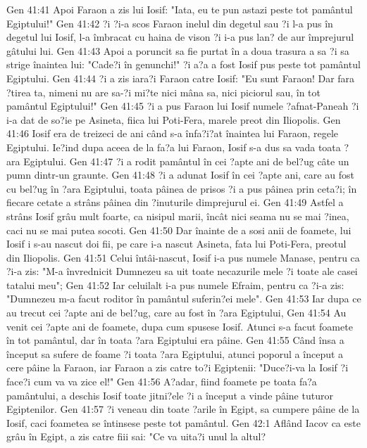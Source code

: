 Gen 41:41  Apoi Faraon a zis lui Iosif: "Iata, eu te pun astazi peste tot pamântul Egiptului!"
Gen 41:42  ?i ?i-a scos Faraon inelul din degetul sau ?i l-a pus în degetul lui Iosif, l-a îmbracat cu haina de vison ?i i-a pus lan? de aur împrejurul gâtului lui.
Gen 41:43  Apoi a poruncit sa fie purtat în a doua trasura a sa ?i sa strige înaintea lui: "Cade?i în genunchi!" ?i a?a a fost Iosif pus peste tot pamântul Egiptului.
Gen 41:44  ?i a zis iara?i Faraon catre Iosif: "Eu sunt Faraon! Dar fara ?tirea ta, nimeni nu are sa-?i mi?te nici mâna sa, nici piciorul sau, în tot pamântul Egiptului!"
Gen 41:45  ?i a pus Faraon lui Iosif numele ?afnat-Paneah ?i i-a dat de so?ie pe Asineta, fiica lui Poti-Fera, marele preot din Iliopolis.
Gen 41:46  Iosif era de treizeci de ani când s-a înfa?i?at înaintea lui Faraon, regele Egiptului. Ie?ind dupa aceea de la fa?a lui Faraon, Iosif s-a dus sa vada toata ?ara Egiptului.
Gen 41:47  ?i a rodit pamântul în cei ?apte ani de bel?ug câte un pumn dintr-un graunte.
Gen 41:48  ?i a adunat Iosif în cei ?apte ani, care au fost cu bel?ug în ?ara Egiptului, toata pâinea de prisos ?i a pus pâinea prin ceta?i; în fiecare cetate a strâns pâinea din ?inuturile dimprejurul ei.
Gen 41:49  Astfel a strâns Iosif grâu mult foarte, ca nisipul marii, încât nici seama nu se mai ?inea, caci nu se mai putea socoti.
Gen 41:50  Dar înainte de a sosi anii de foamete, lui Iosif i s-au nascut doi fii, pe care i-a nascut Asineta, fata lui Poti-Fera, preotul din Iliopolis.
Gen 41:51  Celui întâi-nascut, Iosif i-a pus numele Manase, pentru ca ?i-a zis: "M-a învrednicit Dumnezeu sa uit toate necazurile mele ?i toate ale casei tatalui meu";
Gen 41:52  Iar celuilalt i-a pus numele Efraim, pentru ca ?i-a zis: "Dumnezeu m-a facut roditor în pamântul suferin?ei mele".
Gen 41:53  Iar dupa ce au trecut cei ?apte ani de bel?ug, care au fost în ?ara Egiptului,
Gen 41:54  Au venit cei ?apte ani de foamete, dupa cum spusese Iosif. Atunci s-a facut foamete în tot pamântul, dar în toata ?ara Egiptului era pâine.
Gen 41:55  Când însa a început sa sufere de foame ?i toata ?ara Egiptului, atunci poporul a început a cere pâine la Faraon, iar Faraon a zis catre to?i Egiptenii: "Duce?i-va la Iosif ?i face?i cum va va zice el!"
Gen 41:56  A?adar, fiind foamete pe toata fa?a pamântului, a deschis Iosif toate jitni?ele ?i a început a vinde pâine tuturor Egiptenilor.
Gen 41:57  ?i veneau din toate ?arile în Egipt, sa cumpere pâine de la Iosif, caci foametea se întinsese peste tot pamântul.
Gen 42:1  Aflând Iacov ca este grâu în Egipt, a zis catre fiii sai: "Ce va uita?i unul la altul?
